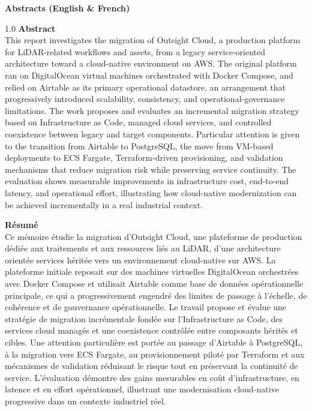\thispagestyle{plain}

\begin{center}
{\LARGE\bfseries Abstracts (English \& French)}
\end{center}

\vspace{0.4cm}

\begin{spacing}{1.0}
\small
\noindent\textbf{Abstract}\\[0.15cm]
This report investigates the migration of Outsight Cloud, a production platform for LiDAR-related workflows and assets, from a legacy service-oriented architecture toward a cloud-native environment on AWS. The original platform ran on DigitalOcean virtual machines orchestrated with Docker Compose, and relied on Airtable as its primary operational datastore, an arrangement that progressively introduced scalability, consistency, and operational-governance limitations. The work proposes and evaluates an incremental migration strategy based on Infrastructure as Code, managed cloud services, and controlled coexistence between legacy and target components. Particular attention is given to the transition from Airtable to PostgreSQL, the move from VM-based deployments to ECS Fargate, Terraform-driven provisioning, and validation mechanisms that reduce migration risk while preserving service continuity. The evaluation shows measurable improvements in infrastructure cost, end-to-end latency, and operational effort, illustrating how cloud-native modernization can be achieved incrementally in a real industrial context.

\vspace{0.35cm}
\noindent\textbf{Résumé}\\[0.15cm]
Ce mémoire étudie la migration d'Outsight Cloud, une plateforme de production dédiée aux traitements et aux ressources liés au LiDAR, d'une architecture orientée services héritée vers un environnement cloud-native sur AWS. La plateforme initiale reposait sur des machines virtuelles DigitalOcean orchestrées avec Docker Compose et utilisait Airtable comme base de données opérationnelle principale, ce qui a progressivement engendré des limites de passage à l'échelle, de cohérence et de gouvernance opérationnelle. Le travail propose et évalue une stratégie de migration incrémentale fondée sur l'Infrastructure as Code, des services cloud managés et une coexistence contrôlée entre composants hérités et cibles. Une attention particulière est portée au passage d'Airtable à PostgreSQL, à la migration vers ECS Fargate, au provisionnement piloté par Terraform et aux mécanismes de validation réduisant le risque tout en préservant la continuité de service. L'évaluation démontre des gains mesurables en coût d'infrastructure, en latence et en effort opérationnel, illustrant une modernisation cloud-native progressive dans un contexte industriel réel.
\end{spacing}
